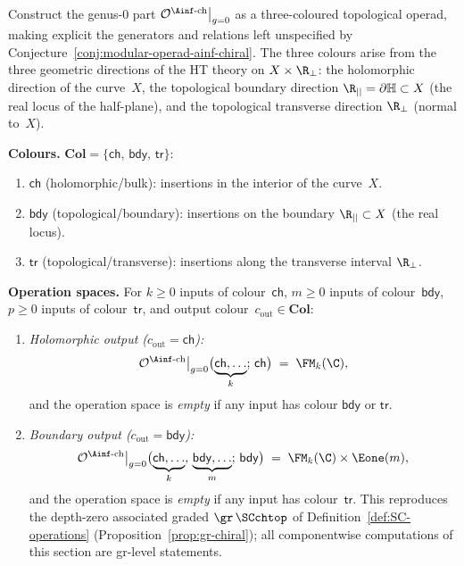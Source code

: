 \begin{construction}
\label{constr:genus0-ainf-chiral-operad}
Construct the genus-$0$ part
$\mathcal{O}^{\Ainf\text{-ch}}\big|_{g=0}$ as a three-coloured
topological operad, making explicit the generators and relations
left unspecified by Conjecture~\ref{conj:modular-operad-ainf-chiral}.
The three colours arise from the three geometric directions
of the HT theory on $X \times \R_{\perp}$: the holomorphic
direction of the curve~$X$, the topological boundary direction
$\R_{||} = \partial\mathbb{H} \subset X$ (the real locus of
the half-plane), and the topological transverse direction
$\R_{\perp}$ (normal to~$X$).

\medskip\noindent
\textbf{Colours.}
$\mathbf{Col} = \{\mathsf{ch},\, \mathsf{bdy},\, \mathsf{tr}\}$:
\begin{enumerate}[label=\textup{(\roman*)}]
\item $\mathsf{ch}$ (holomorphic/bulk): insertions in the interior
 of the curve~$X$.
\item $\mathsf{bdy}$ (topological/boundary): insertions on the
 boundary $\R_{||} \subset X$ (the real locus).
\item $\mathsf{tr}$ (topological/transverse): insertions along the
 transverse interval $\R_{\perp}$.
\end{enumerate}

\medskip\noindent
\textbf{Operation spaces.}
For $k \ge 0$ inputs of colour~$\mathsf{ch}$,
$m \ge 0$ inputs of colour~$\mathsf{bdy}$,
$p \ge 0$ inputs of colour~$\mathsf{tr}$,
and output colour~$c_{\mathrm{out}} \in \mathbf{Col}$:
\begin{enumerate}[label=\textup{(G\arabic*)}]
\item \emph{Holomorphic output
 ($c_{\mathrm{out}} = \mathsf{ch}$):}
 \[
 \mathcal{O}^{\Ainf\text{-ch}}\big|_{g=0}
 \bigl(
 \underbrace{\mathsf{ch},\ldots}_{k};\,\mathsf{ch}
 \bigr)
 \;=\; \FM_k(\C),
 \]
 and the operation space is \emph{empty} if any input has
 colour $\mathsf{bdy}$ or $\mathsf{tr}$.

\item \emph{Boundary output
 ($c_{\mathrm{out}} = \mathsf{bdy}$):}
 \[
 \mathcal{O}^{\Ainf\text{-ch}}\big|_{g=0}
 \bigl(
 \underbrace{\mathsf{ch},\ldots}_{k},\,
 \underbrace{\mathsf{bdy},\ldots}_{m};\,\mathsf{bdy}
 \bigr)
 \;=\; \FM_k(\C) \times \Eone(m),
 \]
 and the operation space is \emph{empty} if any input has
 colour~$\mathsf{tr}$. This reproduces the depth-zero associated
 graded $\gr\,\SCchtop$ of Definition~\ref{def:SC-operations}
 (Proposition~\ref{prop:gr-chiral}); all componentwise
 computations of this section are gr-level statements.


\end{enumerate}
\end{construction}
